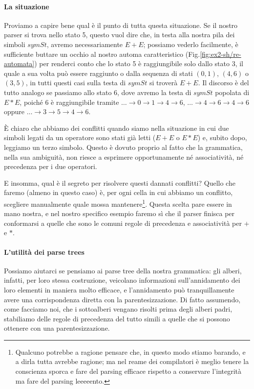\documentclass[class=book, crop=false, oneside, 12pt]{standalone}
\begin{document}
\paragraph{La situazione}
Proviamo a capire bene qual è il punto di tutta questa situazione. Se il nostro parser si trova nello stato 5, questo vuol dire che, in testa alla nostra pila dei simboli \(symSt\), avremo necessariamente \(E + E\); possiamo vederlo facilmente, è sufficiente buttare un occhio al nostro automa caratteristico (Fig.\ref{fig:ex2-sh/re-automata}) per renderci conto che lo stato 5 è raggiungibile solo dallo stato \(3\), il quale a sua volta può essere raggiunto o dalla sequenza di stati \((0, 1)\), \((4, 6)\) o \((3, 5)\), in tutti questi casi sulla testa di \(symSt\) si troverà \(E + E\). Il discorso è del tutto analogo se passiamo allo stato 6, dove avremo la testa di \(symSt\) popolata di \(E * E\), poiché 6 è raggiungibile tramite \(\dots \to 0 \to 1 \to 4 \to 6\), \(\dots \to 4 \to 6 \to 4 \to 6\) oppure \(\dots \to 3 \to 5 \to 4 \to 6\).

È chiaro che abbiamo dei conflitti quando siamo nella situazione in cui due simboli legati da un operatore sono stati già letti (\(E + E\) o \(E * E\)) e, subito dopo, leggiamo un terzo simbolo. Questo è dovuto proprio al fatto che la grammatica, nella sua ambiguità, non riesce a esprimere opportunamente né associatività, né precedenza per i due operatori.

E insomma, qual è il segreto per risolvere questi dannati conflitti? Quello che faremo (almeno in questo caso) è, per ogni cella in cui abbiamo un conflitto, scegliere manualmente quale mossa mantenere\footnote{Qualcuno potrebbe a ragione pensare che, in questo modo stiamo barando, e a dirla tutta avrebbe ragione; ma nel reame dei compilatori è meglio tenere la conscienza sporca e fare del parsing efficace  rispetto a conservare l'integrità ma fare del parsing leeeeento.}. Questa scelta pare essere in mano nostra, e nel nostro specifico esempio faremo sì che il parser finisca per conformarsi a quelle che sono le comuni regole di precedenza e associatività per \(+\) e \(*\). 

\paragraph{L'utilità dei parse trees}
Possiamo aiutarci se pensiamo ai parse tree della nostra grammatica: gli alberi, infatti, per loro stessa costruzione, veicolano informazioni sull'annidamento dei loro elementi in maniera molto efficace, e l'annidamento può tranquillamente avere una corrispondenza diretta con la parentesizzazione. Di fatto assumendo, come facciamo noi, che i sottoalberi vengano risolti prima degli alberi padri, stabiliamo delle regole di precedenza del tutto simili a quelle che si possono ottenere con una parentesizzazione.
\end{document}
